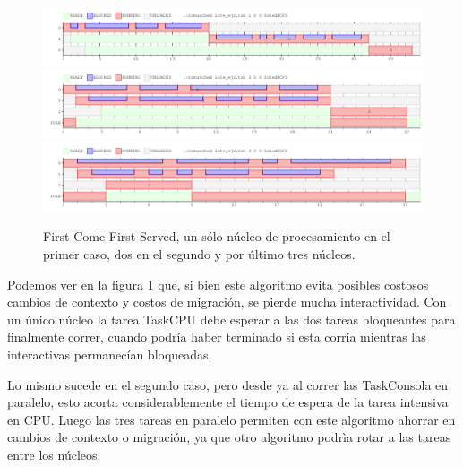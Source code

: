 \begin{figure}[H]
\centering\includegraphics[width=18 cm]{graficos/ej2FCFS1.png}
\centering\includegraphics[width=18 cm]{graficos/ej2FCFS2.png}
\centering\includegraphics[width=18 cm]{graficos/ej2FCFS3.png}
\caption{First-Come First-Served, un sólo núcleo de procesamiento en el primer caso, dos en el segundo y por último tres núcleos.}
\end{figure}



Podemos ver en la figura 1 que, si bien este algoritmo evita posibles costosos cambios de contexto y costos de migración, se pierde mucha interactividad. Con un único núcleo la tarea TaskCPU debe esperar a las dos tareas bloqueantes para finalmente correr, cuando podría haber terminado si esta corría mientras las interactivas permanecían bloqueadas.

Lo mismo sucede en el segundo caso, pero desde ya al correr las TaskConsola en paralelo, esto acorta considerablemente el tiempo de espera de la tarea intensiva en CPU. Luego las tres tareas en paralelo permiten con este algoritmo ahorrar en cambios de contexto o migración, ya que otro algoritmo podrìa rotar a las tareas entre los núcleos.



